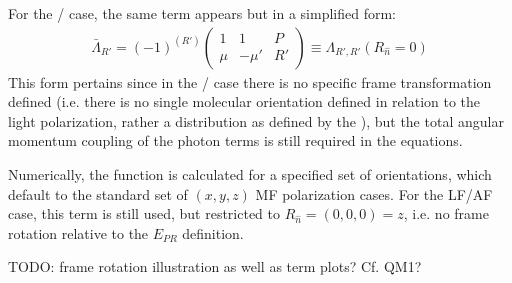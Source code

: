 \documentclass[letterpaper,table,10pt,english]{jupyterBook}
\begin{document}
\sphinxAtStartPar
For the {\hyperref[\detokenize{backmatter/glossary:term-LF}]{}}/{\hyperref[\detokenize{backmatter/glossary:term-AF}]{}} case, the same term appears but in a simplified form:
\begin{equation}\label{equation:part1/theory_tensor_formalism_201122:eq:basis-lambda-LF-defn}
\begin{split}
\bar{\Lambda}_{R'}=(-1)^{(R')}\left(\begin{array}{ccc}
1 & 1 & P\\
\mu & -\mu' & R'
\end{array}\right)\equiv\Lambda_{R',R'}(R_{\hat{n}}=0)
\end{split}
\end{equation}
\sphinxAtStartPar
This form pertains since \sphinxhyphen{} in the {\hyperref[\detokenize{backmatter/glossary:term-LF}]{}}/{\hyperref[\detokenize{backmatter/glossary:term-AF}]{}} case \sphinxhyphen{} there is no specific frame transformation defined (i.e. there is no single molecular orientation defined in relation to the light polarization, rather a distribution as defined by the {\hyperref[\detokenize{backmatter/glossary:term-ADMs}]{}}), but the total angular momentum coupling of the photon terms is still required in the equations.

\sphinxAtStartPar
Numerically, the function is calculated for a specified set of orientations, which default to the standard set of \((x,y,z)\) MF polarization cases. For the LF/AF case, this term is still used, but restricted to \(R_{\hat{n}} = (0,0,0) = z\), i.e. no frame rotation relative to the {\hyperref[\detokenize{backmatter/glossary:term-LF}]{}} \(E_{PR}\) definition.

\sphinxAtStartPar
TODO: frame rotation illustration as well as term plots? Cf. QM1?
\end{document}
